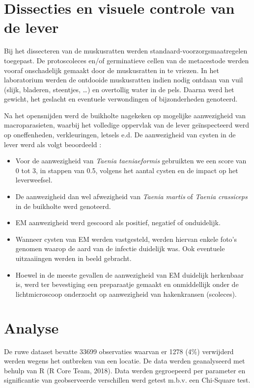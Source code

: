 \documentclass[twoside]{extreport}
\begin{document}
\newpage

\section{Dissecties en visuele controle van de
lever}\label{dissecties-en-visuele-controle-van-de-lever}

Bij het dissecteren van de muskusratten werden
standaard-voorzorgsmaatregelen toegepast. De protoscoleces en/of
germinatieve cellen van de metacestode werden vooraf onschadelijk
gemaakt door de muskusratten in te vriezen. In het laboratorium werden
de ontdooide muskusratten indien nodig ontdaan van vuil (slijk,
bladeren, steentjes, \ldots{}) en overtollig water in de pels. Daarna
werd het gewicht, het geslacht en eventuele verwondingen of
bijzonderheden genoteerd.

Na het opensnijden werd de buikholte nagekeken op mogelijke aanwezigheid
van macroparasieten, waarbij het volledige oppervlak van de lever
geïnspecteerd werd op oneffenheden, verkleuringen, letsels e.d. De
aanwezigheid van cysten in de lever werd als volgt beoordeeld :

\begin{itemize}
\tightlist
\item
  Voor de aanwezigheid van \emph{Taenia taeniaeformis} gebruikten we een
  score van 0 tot 3, in stappen van 0.5, volgens het aantal cysten en de
  impact op het leverweefsel.
\item
  De aanwezigheid dan wel afwezigheid van \emph{Taenia martis} of
  \emph{Taenia crassiceps} in de buikholte werd genoteerd.
\item
  EM aanwezigheid werd gescoord als positief, negatief of onduidelijk.
\item
  Wanneer cysten van EM werden vastgesteld, werden hiervan enkele foto's
  genomen waarop de aard van de infectie duidelijk was. Ook eventuele
  uitzaaiingen werden in beeld gebracht.
\item
  Hoewel in de meeste gevallen de aanwezigheid van EM duidelijk
  herkenbaar is, werd ter bevestiging een preparaatje gemaakt en
  onmiddellijk onder de lichtmicroscoop onderzocht op aanwezigheid van
  hakenkransen (scoleces).
\end{itemize}

\section{Analyse}\label{analyse}

De ruwe dataset bevatte 33699 observaties waarvan er 1278 (4\%)
verwijderd werden wegens het ontbreken van een locatie. De data werden
geanalyseerd met behulp van R (R Core Team, 2018). Data werden
gegroepeerd per parameter en significantie van geobserveerde verschillen
werd getest m.b.v. een Chi-Square test.
\end{document}
